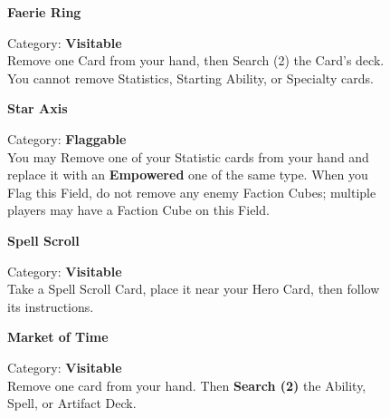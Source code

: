 \begin{figure}[H]
  \begin{minipage}[t]{0.47\textwidth}
    \vspace{0pt}
    \centering
    \phantom{j}\textbf{Faerie Ring}\phantom{j}\par
    \caption{\small Category: \textbf{Visitable}\\
      Remove one Card from your hand, then Search (2) the Card's deck.
      You cannot remove Statistics, Starting Ability, or Specialty cards.}
  \end{minipage}\hfill
  \begin{minipage}[t]{0.47\textwidth}
    \vspace{0pt}
    \centering
    \phantom{j}\textbf{Star Axis}\phantom{j}\par
    \caption{\small Category: \textbf{Flaggable}\\
      You may Remove one of your Statistic cards from your hand and replace it with an \textbf{Empowered} one of the same type.
      When you Flag this Field, do not remove any enemy Faction Cubes; multiple players may have a Faction Cube on this Field.}
  \end{minipage}
\end{figure}

\begin{figure}[H]
  \begin{minipage}[t]{0.47\textwidth}
    \vspace{0pt}
    \centering
    \textbf{Spell Scroll}\par
    \caption{\small Category: \textbf{Visitable}\\
      Take a Spell Scroll Card, place it near your Hero Card, then follow its instructions.
    }
  \end{minipage}\hfill
  \begin{minipage}[t]{0.47\textwidth}
    \vspace{0pt}
    \centering
    \phantom{j}\textbf{Market of Time}\phantom{j}\par
    \caption{\small Category: \textbf{Visitable}\\ Remove one card from your hand.
      Then \textbf{Search (2)} the Ability, Spell, or Artifact Deck.
    }
  \end{minipage}
\end{figure}

